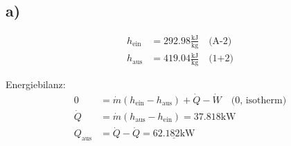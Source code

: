 

\subsection*{a)}
\begin{align*}
    h_{\text{ein}} &= 292.98 \frac{\text{kJ}}{\text{kg}} \quad \text{(A-2)} \\
    h_{\text{aus}} &= 419.04 \frac{\text{kJ}}{\text{kg}} \quad \text{(1+2)}
\end{align*}

Energiebilanz:
\begin{align*}
    0 &= \dot{m} (h_{\text{ein}} - h_{\text{aus}}) + \dot{Q} - \dot{W} \quad \text{(0, isotherm)} \\
    \dot{Q} &= \dot{m} (h_{\text{aus}} - h_{\text{ein}}) = 37.818 \text{kW} \\
    Q_{\text{aus}} &= \dot{Q} - \dot{Q} = \underline{62.182 \text{kW}}
\end{align*}
